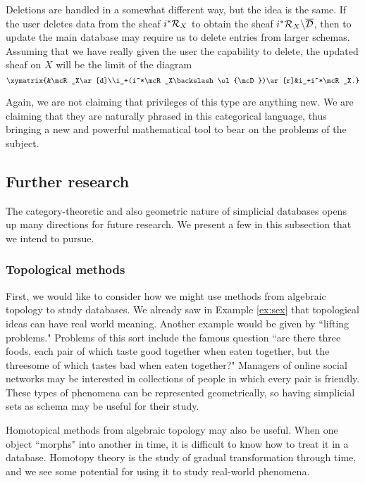 \documentclass{amsart}
\begin{document}
Deletions are handled in a somewhat different way, but the idea is the same.  If the user deletes data from the sheaf $i^*\mathcal{R}_X$ to obtain the sheaf $i^*\mathcal{R}_X\backslash\overline{\mathcal{D}}$, then to update the main database may require us to delete entries from larger schemas.  Assuming that we have really given the user the capability to delete, the updated sheaf on $X$ will be the limit of the diagram $$\xymatrix{&\mcR_X\ar[d]\\i_+(i^*\mcR_X\backslash\ol{\mcD})\ar[r]&i_+i^*\mcR_X.}$$

Again, we are not claiming that privileges of this type are anything new.  We are claiming that they are naturally phrased in this categorical language, thus bringing a new and powerful mathematical tool to bear on the problems of the subject.

\subsection{Further research}\label{subsec:further research}

The category-theoretic and also geometric nature of simplicial databases opens up many directions for future research.  We present a few in this subsection that we intend to pursue.

\subsubsection{Topological methods}

First, we would like to consider how we might use methods from algebraic topology to study databases.  We already saw in Example \ref{ex:sex} that topological ideas can have real world meaning.  Another example would be given by ``lifting problems."  Problems of this sort include the famous question ``are there three foods, each pair of which taste good together when eaten together, but the threesome of which tastes bad when eaten together?"  Managers of online social networks may be interested in collections of people in which every pair is friendly.  These types of phenomena can be represented geometrically, so having simplicial sets as schema may be useful for their study.

Homotopical methods from algebraic topology may also be useful.  When one object ``morphs" into another in time, it is difficult to know how to treat it in a database.  Homotopy theory is the study of gradual transformation through time, and we see some potential for using it to study real-world phenomena.
\end{document}
